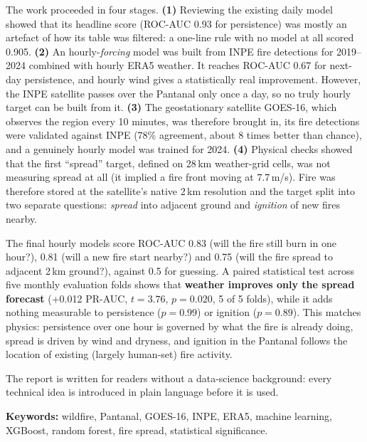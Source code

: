 \documentclass[11pt,a4paper,oneside]{report}
\begin{document}
The work proceeded in four stages. \textbf{(1)} Reviewing the existing daily
model showed that its headline score (ROC-AUC 0.93 for persistence) was mostly
an artefact of how its table was filtered: a one-line rule with no model at all
scored 0.905. \textbf{(2)} An hourly-\emph{forcing} model was built from INPE
fire detections for 2019--2024 combined with hourly ERA5 weather. It reaches
ROC-AUC 0.67 for next-day persistence, and hourly wind gives a statistically
real improvement. However, the INPE satellite passes over the Pantanal only once
a day, so no truly hourly target can be built from it. \textbf{(3)} The
geostationary satellite GOES-16, which observes the region every 10 minutes,
was therefore brought in, its fire detections were validated against INPE (78\%
agreement, about 8 times better than chance), and a genuinely hourly model was
trained for 2024. \textbf{(4)} Physical checks showed that the first
\enquote{spread} target, defined on 28\,km weather-grid cells, was not measuring
spread at all (it implied a fire front moving at 7.7\,m/s). Fire was therefore
stored at the satellite's native 2\,km resolution and the target split into two
separate questions: \emph{spread} into adjacent ground and \emph{ignition} of new
fires nearby.

The final hourly models score ROC-AUC 0.83 (will the fire still burn in one
hour?), 0.81 (will a new fire start nearby?) and 0.75 (will the fire spread to
adjacent 2\,km ground?), against 0.5 for guessing. A paired statistical test
across five monthly evaluation folds shows that \textbf{weather improves only
the spread forecast} (+0.012 PR-AUC, $t=3.76$, $p=0.020$, 5 of 5 folds), while it
adds nothing measurable to persistence ($p=0.99$) or ignition ($p=0.89$). This
matches physics: persistence over one hour is governed by what the fire is
already doing, spread is driven by wind and dryness, and ignition in the
Pantanal follows the location of existing (largely human-set) fire activity.

The report is written for readers without a data-science background: every
technical idea is introduced in plain language before it is used.

\medskip
\textbf{Keywords:} wildfire, Pantanal, GOES-16, INPE, ERA5, machine learning,
XGBoost, random forest, fire spread, statistical significance.

\tableofcontents
\listoffigures
\listoftables

\cleardoublepage
{}
\end{document}
